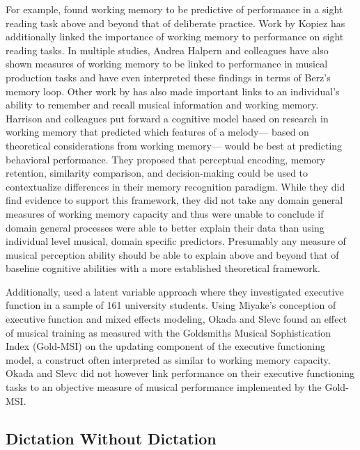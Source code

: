 \documentclass[12pt,]{book}
\begin{document}
For example, \citet{meinzDeliberatePracticeNecessary2010} found working memory to be predictive of performance in a sight reading task above and beyond that of deliberate practice.
Work by Kopiez \citep{kopiezDynamicModelSkills2006, kopiezGeneralModelSkills2008} has additionally linked the importance of working memory to performance on sight reading tasks.
In multiple studies, Andrea Halpern and colleagues have also shown measures of working memory to be linked to performance in musical production tasks \citep{halpernEffectsTimbreTempo2008, nicholsScoreOneJazz2018} and have even interpreted these findings in terms of Berz's memory loop.
Other work by \citet{harrisonModellingMelodicDiscrimination2016} has also made important links to an individual's ability to remember and recall musical information and working memory.
Harrison and colleagues put forward a cognitive model based on research in working memory that predicted which features of a melody--- based on theoretical considerations from working memory--- would be best at predicting behavioral performance.
They proposed that perceptual encoding, memory retention, similarity comparison, and decision-making could be used to contextualize differences in their memory recognition paradigm.
While they did find evidence to support this framework, they did not take any domain general measures of working memory capacity and thus were unable to conclude if domain general processes were able to better explain their data than using individual level musical, domain specific predictors.
Presumably any measure of musical perception ability should be able to explain above and beyond that of baseline cognitive abilities with a more established theoretical framework.

Additionally, \citet{okadaIndividualDifferencesMusical2018} used a latent variable approach where they investigated executive function in a sample of 161 university students.
Using Miyake's conception of executive function \citep{miyakeNatureOrganizationIndividual2012, miyakeUnityDiversityExecutive2000} and mixed effects modeling, Okada and Slevc found an effect of musical training as measured with the Goldsmiths Musical Sophistication Index (Gold-MSI) on the updating component of the executive functioning model, a construct often interpreted as similar to working memory capacity.
Okada and Slevc did not however link performance on their executive functioning tasks to an objective measure of musical performance implemented by the Gold-MSI.

\hypertarget{dictation-without-dictation}{%
\subsection{Dictation Without Dictation}\label{dictation-without-dictation}}
\end{document}
